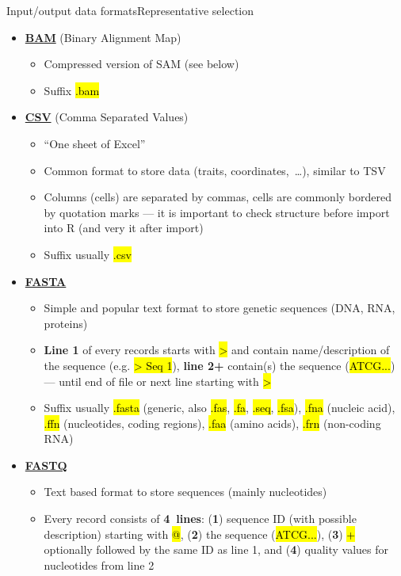 \documentclass[compress, ucs, xelatex, 11pt, xcolor=svgnames,
	hyperref={
		bookmarks=true,
		unicode=true,
		colorlinks=true,
		pdftitle={Molecular data in R},
		plainpages=false,
		pdfauthor={Vojtech Zeisek},
		pdfsubject={Course about phylogeny and evolution in R},
		pdfcreator={XeLaTeX},
		pdfkeywords={R, evolution, phylogeny, molecular data},
		linkcolor=Tomato,
		anchorcolor=SaddleBrown,
		citecolor=Goldenrod,
		filecolor=DarkMagenta,
		menucolor=Sienna,
		urlcolor=DarkTurquoise,
		pdftex},
	url={hyphens, lowtilde} %
	]{beamer}
\renewcommand{\texttt}[1]{\hl{\ttfamily #1}}
\begin{document}
\begin{frame}[allowframebreaks]{Input/output data formats}{Representative selection}
	\begin{itemize}
		\item \href{https://en.wikipedia.org/wiki/Binary_Alignment_Map}{\textbf{BAM}} (Binary Alignment Map)
		\begin{itemize}
			\item Compressed version of SAM (see below)
			\item Suffix \texttt{*.bam}
		\end{itemize}
		\item \href{https://en.wikipedia.org/wiki/Comma-separated_values}{\textbf{CSV}} (Comma Separated Values)
		\begin{itemize}
			\item ``One sheet of Excel''
			\item Common format to store data (traits, coordinates,~\ldots), similar to TSV
			\item Columns (cells) are separated by commas, cells are commonly bordered by quotation marks --- it is important to check structure before import into R (and very it after import)
			\item Suffix usually \texttt{*.csv}
		\end{itemize}
		\item \href{https://en.wikipedia.org/wiki/FASTA_format}{\textbf{FASTA}}
		\begin{itemize}
			\item Simple and popular text format to store genetic sequences (DNA, RNA, proteins)
			\item \textbf{Line 1} of every records starts with \texttt{>} and contain name/description of the sequence (e.g. \texttt{> Seq 1}), \textbf{line 2+} contain(s) the sequence (\texttt{ATCG...}) --- until end of file or next line starting with \texttt{>}
			\item Suffix usually \texttt{*.fasta} (generic, also \texttt{*.fas}, \texttt{*.fa}, \texttt{*.seq}, \texttt{*.fsa}), \texttt{*.fna} (nucleic acid), \texttt{*.ffn} (nucleotides, coding regions), \texttt{*.faa} (amino acids), \texttt{*.frn} (non-coding RNA)
		\end{itemize}
		\item \href{https://en.wikipedia.org/wiki/FASTQ_format}{\textbf{FASTQ}}
		\begin{itemize}
			\item Text based format to store sequences (mainly nucleotides)
			\item Every record consists of \textbf{4~lines}: (\textbf{1}) sequence ID (with possible description) starting with \texttt{@}, (\textbf{2}) the sequence (\texttt{ATCG...}), (\textbf{3}) \texttt{+} optionally followed by the same ID as line 1, and (\textbf{4}) quality values for nucleotides from line 2

\end{itemize}
\end{itemize}
\end{frame}
\end{document}
